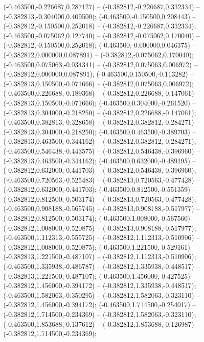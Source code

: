  (-0.463500,-0.226687,0.287127) -- (-0.382812,-0.226687,0.332334) -- (-0.382813,-0.304000,0.409500);
 (-0.463500,-0.150500,0.208443) -- (-0.382812,-0.150500,0.252018) -- (-0.382812,-0.226687,0.332334);
 (-0.463500,-0.075062,0.127740) -- (-0.382812,-0.075062,0.170040) -- (-0.382812,-0.150500,0.252018);
 (-0.463500,-0.000000,0.046375) -- (-0.382812,0.000000,0.087891) -- (-0.382812,-0.075062,0.170040);
 (-0.463500,0.075063,-0.034341) -- (-0.382812,0.075063,0.006972) -- (-0.382812,0.000000,0.087891);
 (-0.463500,0.150500,-0.113282) -- (-0.382813,0.150500,-0.071666) -- (-0.382812,0.075063,0.006972);
 (-0.463500,0.226688,-0.189368) -- (-0.382812,0.226688,-0.147061) -- (-0.382813,0.150500,-0.071666);
 (-0.463500,0.304000,-0.261520) -- (-0.382813,0.304000,-0.218250) -- (-0.382812,0.226688,-0.147061);
 (-0.463500,0.382813,-0.328658) -- (-0.382812,0.382812,-0.284271) -- (-0.382813,0.304000,-0.218250);
 (-0.463500,0.463500,-0.389703) -- (-0.382813,0.463500,-0.344162) -- (-0.382812,0.382812,-0.284271);
 (-0.463500,0.546438,-0.443575) -- (-0.382812,0.546438,-0.396960) -- (-0.382813,0.463500,-0.344162);
 (-0.463500,0.632000,-0.489195) -- (-0.382812,0.632000,-0.441703) -- (-0.382812,0.546438,-0.396960);
 (-0.463500,0.720563,-0.525483) -- (-0.382813,0.720563,-0.477428) -- (-0.382812,0.632000,-0.441703);
 (-0.463500,0.812500,-0.551359) -- (-0.382812,0.812500,-0.503174) -- (-0.382813,0.720563,-0.477428);
 (-0.463500,0.908188,-0.565745) -- (-0.382813,0.908188,-0.517977) -- (-0.382812,0.812500,-0.503174);
 (-0.463500,1.008000,-0.567560) -- (-0.382812,1.008000,-0.520875) -- (-0.382813,0.908188,-0.517977);
 (-0.463500,1.112313,-0.555725) -- (-0.382812,1.112313,-0.510906) -- (-0.382812,1.008000,-0.520875);
 (-0.463500,1.221500,-0.529161) -- (-0.382813,1.221500,-0.487107) -- (-0.382812,1.112313,-0.510906);
 (-0.463500,1.335938,-0.486787) -- (-0.382812,1.335938,-0.448517) -- (-0.382813,1.221500,-0.487107);
 (-0.463500,1.456000,-0.427525) -- (-0.382812,1.456000,-0.394172) -- (-0.382812,1.335938,-0.448517);
 (-0.463500,1.582063,-0.350295) -- (-0.382812,1.582063,-0.323110) -- (-0.382812,1.456000,-0.394172);
 (-0.463500,1.714500,-0.254017) -- (-0.382812,1.714500,-0.234369) -- (-0.382812,1.582063,-0.323110);
 (-0.463500,1.853688,-0.137612) -- (-0.382812,1.853688,-0.126987) -- (-0.382812,1.714500,-0.234369);
